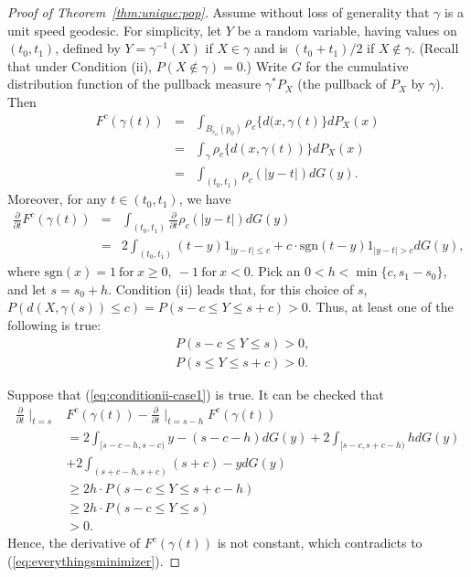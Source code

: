 \documentclass[preprint]{imsart}
\theoremstyle{plain}
\theoremstyle{remark}
\begin{document}
\begin{appendix}
\begin{proof}[Proof of Theorem~\ref{thm:unique:pop}]
Assume without loss of generality that $\gamma$ is a unit speed geodesic. For simplicity, let $Y$ be a random variable, having values on $(t_0, t_1)$, defined by $Y = \gamma^{-1}(X)$ if $X \in \gamma$ and is $(t_0 + t_1 ) /2$ if $X \notin \gamma$. (Recall that under Condition (ii), $P(X \notin \gamma) = 0$.) Write $G$ for the cumulative distribution function of the pullback measure $\gamma^{*}P_{X}$ (the pullback of $P_{X}$ by $\gamma$). Then 
\begin{eqnarray*}
F^c(\gamma(t)) &=& \int_{B_{r_0}(p_0)} \rho_c \{d(x, \gamma(t)\} dP_{X}(x) \\
 &=& \int_{\gamma} \rho_c \{d(x, \gamma(t))\} dP_{X}(x) \\ 
 &=& \int_{(t_0,t_1)} \rho_c (|y - t|) dG(y).
\end{eqnarray*}
Moreover, for any $t \in (t_0,t_1)$, we have 
\begin{eqnarray*}
\frac{\partial}{\partial t} F^c(\gamma(t)) &=& \int_{(t_0,t_1)} 
   \frac{\partial}{\partial t} \rho_c (|y - t|) dG(y) \\
    &=& 2\int_{(t_0,t_1)} 
   (t-y)1_{|y-t|\le c} + c \cdot \mbox{sgn}(t-y)1_{|y-t| > c}dG(y),
\end{eqnarray*}
where $\mbox{sgn}(x) = 1 ~ \mbox{for} ~ x \ge 0, ~ -1 ~ \mbox{for} ~ x<0$. Pick an $0< h < \min\{c, s_1-s_0\}$, and let $s = s_0 + h$. 
Condition (ii) leads that, for this choice of $s$, 
$P(d(X, \gamma(s)) \le c) = P(s-c \le Y \le s +c ) >0$. Thus, at least one of the following is true:\begin{align}
    & P(s-c \le Y \le s) > 0, \label{eq:conditionii-case1}\\
    & P(s \le Y \le s+c) > 0.  \label{eq:conditionii-case2}
\end{align}

Suppose that (\ref{eq:conditionii-case1}) is true. It can be checked that 
\begin{align*}
\frac{\partial}{\partial t}\mid_{t = s} & F^c(\gamma(t)) - \frac{\partial}{\partial t}\mid_{t = s-h} F^c(\gamma(t)) \\
  &=  2\int_{[s-c-h,s-c)} y - (s-c-h) dG(y) + 
     2\int_{[s-c,s+c-h)} h dG(y) \\ 
   &  + 2\int_{(s+c-h,s+c)} (s+c) - y  dG(y) \\
   & \ge  2h \cdot P( s-c \le Y \le s+c - h) \\
   & \ge  2h\cdot P(s-c \le Y \le s)  \\ 
   & > 0.
\end{align*} 
Hence, the derivative of $F^c(\gamma(t))$ is not constant, which contradicts to (\ref{eq:everythingsminimizer}). 


\end{proof}
\end{appendix}
\end{document}
